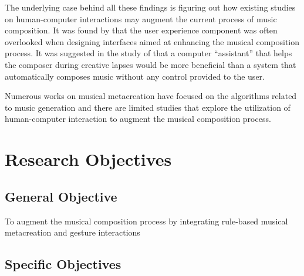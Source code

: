 

The underlying case behind all these findings is figuring out how existing studies on human-computer interactions may augment the current process of music composition. It was found by \citet{brown2017user} that the user experience component was often overlooked when designing interfaces aimed at enhancing the musical composition process. It was suggested in the study of \citep{levitt1992representation} that a computer ``assistant'' that helps the composer during creative lapses would be more beneficial than a system that automatically composes music without any control provided to the user. 

Numerous works on musical metacreation have focused on the algorithms related to music generation and there are limited studies that explore the utilization of human-computer interaction to augment the musical composition process.

\begin{comment}
Although there are already several musical composition tools that aid in the composition of music such as Hyperscore \citep{farbood2004hyperscore} and HARP \citep{camurri1991harp}, the ability to assist composers in a way that it helps them generate ideas are what these systems lack. The graphical user interface of these systems improve the overall user experience of musical composers, but the important problem still remains which is coming up with musical ideas. 
\end{comment}


   

\section{Research Objectives}
\label{sec:researchobjectives}

\subsection{General Objective}
\label{sec:generalobjective}

To augment the musical composition process by integrating rule-based musical metacreation and gesture interactions

\subsection{Specific Objectives}
\label{sec:specificobjectives}


